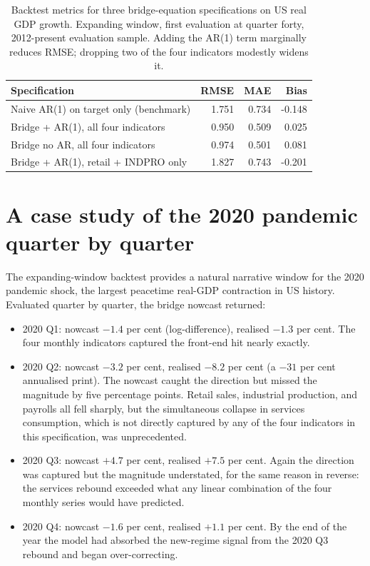\begin{table}

\caption{\label{tab:metrics}Backtest metrics for three bridge-equation specifications on US real GDP growth. Expanding window, first evaluation at quarter forty, 2012-present evaluation sample. Adding the AR(1) term marginally reduces RMSE; dropping two of the four indicators modestly widens it.}
\centering
\begin{tabular}[t]{lrrr}
\toprule
Specification & RMSE & MAE & Bias\\
\midrule
Naive AR(1) on target only (benchmark) & 1.751 & 0.734 & -0.148\\
Bridge + AR(1), all four indicators & 0.950 & 0.509 & 0.025\\
Bridge no AR, all four indicators & 0.974 & 0.501 & 0.081\\
Bridge + AR(1), retail + INDPRO only & 1.827 & 0.743 & -0.201\\
\bottomrule
\end{tabular}
\end{table}

\section{A case study of the 2020 pandemic quarter by quarter}\label{a-case-study-of-the-2020-pandemic-quarter-by-quarter}

The expanding-window backtest provides a natural narrative window
for the 2020 pandemic shock, the largest peacetime real-GDP
contraction in US history. Evaluated quarter by quarter, the bridge
nowcast returned:

\begin{itemize}
\tightlist
\item
  2020 Q1: nowcast \(-1.4\) per cent (log-difference), realised
  \(-1.3\) per cent. The four monthly indicators captured the
  front-end hit nearly exactly.
\item
  2020 Q2: nowcast \(-3.2\) per cent, realised \(-8.2\) per cent (a
  \(-31\) per cent annualised print). The nowcast caught the
  direction but missed the magnitude by five percentage points.
  Retail sales, industrial production, and payrolls all fell
  sharply, but the simultaneous collapse in services consumption,
  which is not directly captured by any of the four indicators in
  this specification, was unprecedented.
\item
  2020 Q3: nowcast \(+4.7\) per cent, realised \(+7.5\) per cent. Again
  the direction was captured but the magnitude understated, for the
  same reason in reverse: the services rebound exceeded what any
  linear combination of the four monthly series would have
  predicted.
\item
  2020 Q4: nowcast \(-1.6\) per cent, realised \(+1.1\) per cent. By
  the end of the year the model had absorbed the new-regime signal
  from the 2020 Q3 rebound and began over-correcting.
\end{itemize}

